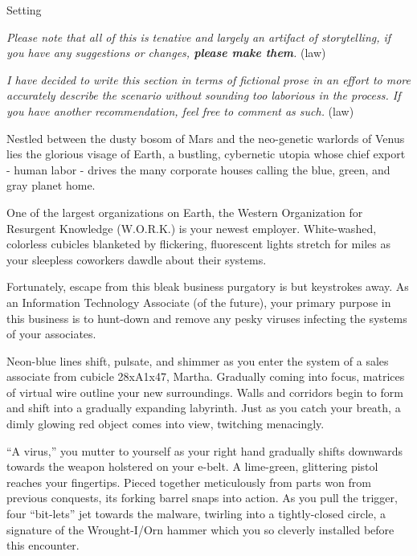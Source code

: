 \documentclass[12pt]{report}
\begin{document}

\begin{section}{Setting}

\emph{Please note that all of this is tenative and largely an artifact of storytelling, 
if you have any suggestions or changes, \textbf{please make them}.}
\newline(law)
\newline

\noindent \emph{I have decided to write this section in terms of fictional prose in an 
effort to more accurately describe the scenario without sounding too laborious in the 
process. If you have another recommendation, feel free to comment as such.}
\newline(law)
\newline

Nestled between the dusty bosom of Mars and the neo-genetic warlords of Venus lies the 
glorious visage of Earth, a bustling, cybernetic utopia whose chief export - human labor 
- drives the many corporate houses calling the blue, green, and gray planet home.

One of the largest organizations on Earth, the Western Organization for Resurgent 
Knowledge (W.O.R.K.) is your newest employer. White-washed, colorless cubicles blanketed 
by flickering, fluorescent lights stretch for miles as your sleepless coworkers dawdle 
about their systems.

Fortunately, escape from this bleak business purgatory is but keystrokes away. As an 
Information Technology Associate (of the future), your primary purpose in this business 
is to hunt-down and remove any pesky viruses infecting the systems of your associates.
\newline

Neon-blue lines shift, pulsate, and shimmer as you enter the system of a sales associate 
from cubicle 28xA1x47, Martha. Gradually coming into focus, matrices of virtual wire 
outline your new surroundings. Walls and corridors begin to form and shift into a gradually 
expanding labyrinth. Just as you catch your breath, a dimly glowing red object comes into 
view, twitching menacingly.

``A virus,'' you mutter to yourself as your right hand gradually shifts downwards towards 
the weapon holstered on your e-belt. A lime-green, glittering pistol reaches your 
fingertips. Pieced together meticulously from parts won from previous conquests, its forking 
barrel snaps into action. As you pull the trigger, four ``bit-lets'' jet towards the malware, 
twirling into a tightly-closed circle, a signature of the Wrought-I/Orn hammer which you so 
cleverly installed before this encounter.


\end{section}
\end{document}
